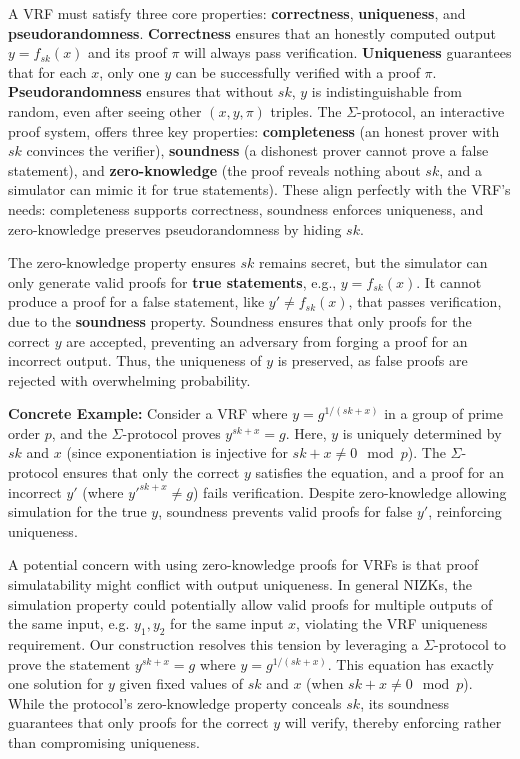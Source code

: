 A VRF must satisfy three core properties: \textbf{correctness}, \textbf{uniqueness}, and \textbf{pseudorandomness}. \textbf{Correctness} ensures that an honestly computed output $y = f_{sk}(x)$ and its proof $\pi$ will always pass verification. \textbf{Uniqueness} guarantees that for each $x$, only one $y$ can be successfully verified with a proof $\pi$. \textbf{Pseudorandomness} ensures that without $sk$, $y$ is indistinguishable from random, even after seeing other $(x, y, \pi)$ triples. The $\Sigma$-protocol, an interactive proof system, offers three key properties: \textbf{completeness} (an honest prover with $sk$ convinces the verifier), \textbf{soundness} (a dishonest prover cannot prove a false statement), and \textbf{zero-knowledge} (the proof reveals nothing about $sk$, and a simulator can mimic it for true statements). These align perfectly with the VRF's needs: completeness supports correctness, soundness enforces uniqueness, and zero-knowledge preserves pseudorandomness by hiding $sk$.

The zero-knowledge property ensures $sk$ remains secret, but the simulator can only generate valid proofs for \textbf{true statements}, e.g., $y = f_{sk}(x)$. It cannot produce a proof for a false statement, like $y' \neq f_{sk}(x)$, that passes verification, due to the \textbf{soundness} property. Soundness ensures that only proofs for the correct $y$ are accepted, preventing an adversary from forging a proof for an incorrect output. Thus, the uniqueness of $y$ is preserved, as false proofs are rejected with overwhelming probability.

\textbf{Concrete Example:} Consider a VRF where $y = g^{1/(sk + x)}$ in a group of prime order $p$, and the $\Sigma$-protocol proves $y^{sk + x} = g$. Here, $y$ is uniquely determined by $sk$ and $x$ (since exponentiation is injective for $sk + x \neq 0 \mod p$). The $\Sigma$-protocol ensures that only the correct $y$ satisfies the equation, and a proof for an incorrect $y'$ (where $y'^{sk + x} \neq g$) fails verification. Despite zero-knowledge allowing simulation for the true $y$, soundness prevents valid proofs for false $y'$, reinforcing uniqueness.

A potential concern with using zero-knowledge proofs for VRFs is that proof simulatability might conflict with output uniqueness. In general NIZKs, the simulation property could potentially allow valid proofs for multiple outputs of the same input, e.g. $y_1, y_2$ for the same input $x$, violating the VRF uniqueness requirement. Our construction resolves this tension by leveraging a $\Sigma$-protocol to prove the statement $y^{sk + x} = g$ where $y = g^{1/(sk + x)}$. This equation has exactly one solution for $y$ given fixed values of $sk$ and $x$ (when $sk + x \neq 0 \mod p$). While the protocol's zero-knowledge property conceals $sk$, its soundness guarantees that only proofs for the correct $y$ will verify, thereby enforcing rather than compromising uniqueness.


